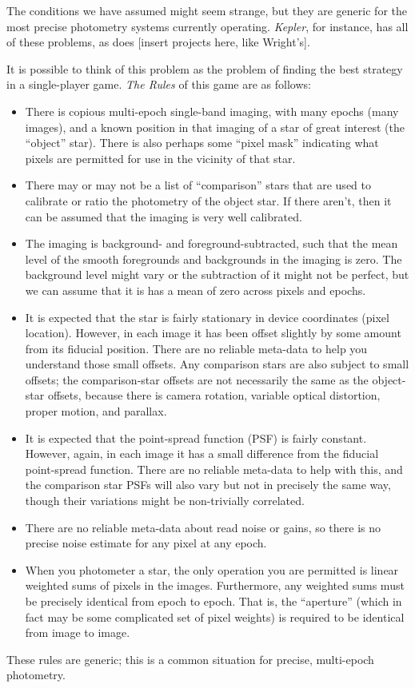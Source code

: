 \documentclass[12pt, letterpaper, preprint]{aastex}
\newcommand{\project}[1]{\textsl{#1}}
\begin{document}
The conditions we have assumed might seem strange,
  but they are generic for the most precise photometry systems currently operating.
\project{Kepler}, for instance, has all of these problems,
  as does [insert projects here, like Wright's].

It is possible to think of this problem as the problem of finding the best strategy in a single-player game.
\emph{The Rules} of this game are as follows:
\begin{itemize}
\item
  There is copious multi-epoch single-band imaging,
  with many epochs (many images),
  and a known position in that imaging of a star of great interest (the ``object'' star).
  There is also perhaps some ``pixel mask'' indicating what pixels are permitted for use
  in the vicinity of that star.
\item
  There may or may not be a list of ``comparison'' stars
  that are used to calibrate or ratio the photometry of the object star.
  If there aren't, then it can be assumed that the imaging is very well calibrated.
\item
  The imaging is background- and foreground-subtracted,
  such that the mean level of the smooth foregrounds and backgrounds in the imaging is zero.
  The background level might vary or the subtraction of it might not be perfect,
  but we can assume that it is has a mean of zero across pixels and epochs.
\item
  It is expected that the star is fairly stationary in device coordinates (pixel location).
  However, in each image it has been offset slightly by some amount from its fiducial position.
  There are no reliable meta-data to help you understand those small offsets.
  Any comparison stars are also subject to small offsets;
  the comparison-star offsets are not necessarily the same as the object-star offsets,
  because there is camera rotation, variable optical distortion, proper motion, and parallax.
\item
  It is expected that the point-spread function (PSF) is fairly constant.
  However, again, in each image it has a small difference from the fiducial point-spread function.
  There are no reliable meta-data to help with this,
  and the comparison star PSFs will also vary but not in precisely the same way,
  though their variations might be non-trivially correlated.
\item
  There are no reliable meta-data about read noise or gains,
  so there is no precise noise estimate for any pixel at any epoch.
\item
  When you photometer a star,
  the only operation you are permitted is linear weighted sums of pixels in the images.
  Furthermore, any weighted sums must be precisely identical from epoch to epoch.
  That is, the ``aperture''
  (which in fact may be some complicated set of pixel weights)
  is required to be identical from image to image.
\end{itemize}
These rules are generic;
  this is a common situation for precise, multi-epoch photometry.
\end{document}
